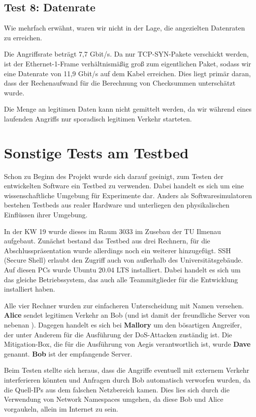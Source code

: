 \documentclass[../review_3.tex]{subfiles}
\begin{document}
\subsection{Test 8: Datenrate}
    Wie mehrfach erwähnt, waren wir nicht in der Lage, die angezielten Datenraten zu erreichen. 
    
    Die Angriffsrate beträgt 7,7 Gbit/s. Da nur TCP-SYN-Pakete verschickt werden, ist der Ethernet-1-Frame verhältnismäßig groß zum eigentlichen Paket, sodass wir eine Datenrate von 11,9 Gbit/s auf dem Kabel erreichen.
    Dies liegt primär daran, dass der Rechenaufwand für die Berechnung von Checksummen unterschätzt wurde.
    
    Die Menge an legitimen Daten kann nicht gemittelt werden, da wir während eines laufenden Angriffs nur sporadisch legitimen Verkehr starteten.

\section{Sonstige Tests am Testbed}

Schon zu Beginn des Projekt wurde sich darauf geeinigt, zum Testen der entwickelten Software ein Testbed zu verwenden. Dabei handelt es sich um \glqq eine wissenschaftliche Umgebung für Experimente dar. Anders als Softwaresimulatoren bestehen Testbeds aus realer Hardware und unterliegen den physikalischen Einflüssen ihrer Umgebung.\grqq\cite{testbed}

In der KW 19 wurde dieses im Raum 3033 im Zusebau der TU Ilmenau aufgebaut. Zunächst bestand das Testbed aus drei Rechnern, für die Abschlusspräsentation wurde allerdings noch ein weiterer hinzugefügt. SSH (Secure Shell) erlaubt den Zugriff auch von außerhalb des Universitätsgebäude. Auf diesen PCs wurde Ubuntu 20.04 LTS installiert. Dabei handelt es sich um das gleiche Betriebssystem, das auch alle Teammitglieder für die Entwicklung installiert haben.

Alle vier Rechner wurden zur einfacheren Unterscheidung mit Namen versehen. \textbf{Alice} sendet legitimen Verkehr an Bob (und ist damit der \glqq freundliche Server von nebenan \grqq). Dagegen handelt es sich bei \textbf{Mallory} um den bösartigen Angreifer, der unter Anderem für die Ausführung der DoS-Attacken zuständig ist. Die Mitigation-Box, die für die Ausführung von Aegis verantwortlich ist, wurde \textbf{Dave} genannt. \textbf{Bob} ist der empfangende Server.


Beim Testen stellte sich heraus, dass die Angriffe eventuell mit externem Verkehr interferieren könnten und Anfragen durch Bob automatisch verworfen wurden, da die Quell-IPs aus dem falschen Netzbereich kamen. Dies lies sich durch die Verwendung von Network Namespaces umgehen, da diese Bob und Alice vorgaukeln, allein im Internet zu sein.
\end{document}
